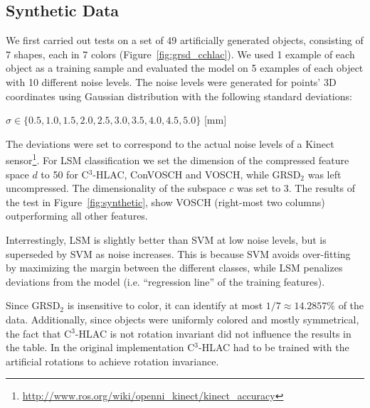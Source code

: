 \documentclass[a4paper, 10 pt, conference]{sty/ieeeconf}
\begin{document}
\subsection{Synthetic Data}
We first carried out tests on a set of 49 artificially generated objects, consisting of
7 shapes, each in 7 colors (Figure~\ref{fig:grsd_cchlac}). We used 1 example of 
each object as a training sample and evaluated the model on 5 examples of each object with 
10 different noise levels. The noise levels were generated for points' 3D coordinates 
using Gaussian distribution with the following standard deviations:
\begin{center}
$\sigma \in \{0.5, 1.0, 1.5, 2.0, 2.5, 3.0, 3.5, 4.0, 4.5, 5.0\}$ [mm]
\end{center}
The deviations were set to correspond to the actual noise levels of a Kinect 
sensor\footnote{\url{http://www.ros.org/wiki/openni_kinect/kinect_accuracy}}.
For LSM classification we set the dimension of the compressed feature space $d$ to 
50 for C$^3$-HLAC, ConVOSCH and VOSCH, while GRSD$_2$ was left uncompressed. 
The dimensionality of the subspace $c$ was set to 3.
The results of the test in Figure~\ref{fig:synthetic},
show VOSCH (right-most two columns) outperforming all other features.

Interrestingly, LSM is slightly better than SVM at low noise levels, but is superseded
by SVM as noise increases. This is because SVM avoids over-fitting by maximizing the margin
between the different classes, while LSM penalizes deviations from the model
(i.e. ``regression line'' of the training features).


Since GRSD$_2$ is insensitive to color, it can identify at most $1/7 \approx 14.2857\%$ of the data.
Additionally, since objects were uniformly colored and mostly symmetrical, the fact that C$^3$-HLAC 
is not rotation invariant did not influence the results in the table. In the original implementation C$^3$-HLAC 
had to be trained with the artificial rotations to achieve rotation invariance.
\end{document}

